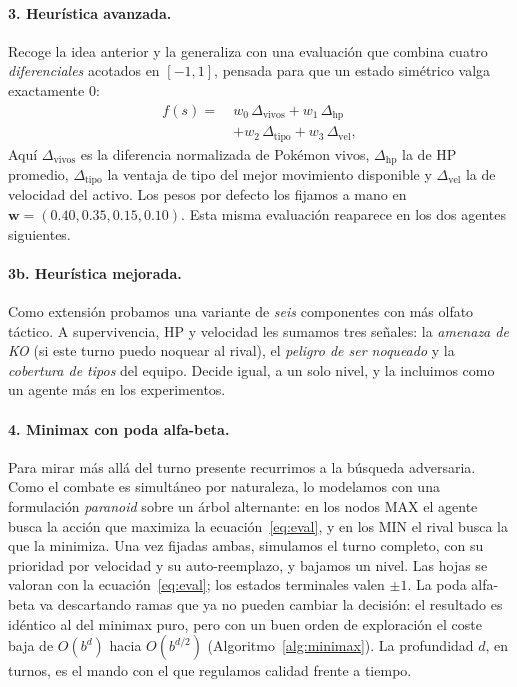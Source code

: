\documentclass[11pt]{article}
\begin{document}
\paragraph{3. Heurística avanzada.} Recoge la idea anterior y la generaliza con una
evaluación que combina cuatro \emph{diferenciales} acotados en $[-1,1]$, pensada
para que un estado simétrico valga exactamente $0$:
\begin{align}
\label{eq:eval}
f(s) =\ & w_0\,\Delta_{\text{vivos}} + w_1\,\Delta_{\text{hp}} \nonumber\\
        & + w_2\,\Delta_{\text{tipo}} + w_3\,\Delta_{\text{vel}},
\end{align}
Aquí $\Delta_{\text{vivos}}$ es la diferencia normalizada de Pokémon vivos,
$\Delta_{\text{hp}}$ la de HP promedio, $\Delta_{\text{tipo}}$ la ventaja de tipo
del mejor movimiento disponible y $\Delta_{\text{vel}}$ la de velocidad del activo.
Los pesos por defecto los fijamos a mano en $\mathbf{w}=(0.40,0.35,0.15,0.10)$.
Esta misma evaluación reaparece en los dos agentes siguientes.

\paragraph{3b. Heurística mejorada.} Como extensión probamos una variante de
\emph{seis} componentes con más olfato táctico. A supervivencia, HP y velocidad les
sumamos tres señales: la \emph{amenaza de KO} (si este turno puedo noquear al
rival), el \emph{peligro de ser noqueado} y la \emph{cobertura de tipos} del equipo.
Decide igual, a un solo nivel, y la incluimos como un agente más en los
experimentos.

\paragraph{4. Minimax con poda alfa-beta.} Para mirar más allá del turno presente
recurrimos a la búsqueda adversaria. Como el combate es simultáneo por naturaleza,
lo modelamos con una formulación \emph{paranoid} sobre un árbol alternante: en los
nodos MAX el agente busca la acción que maximiza la ecuación~\eqref{eq:eval}, y en
los MIN el rival busca la que la minimiza. Una vez fijadas ambas, simulamos el
turno completo, con su prioridad por velocidad y su auto-reemplazo, y bajamos un
nivel. Las hojas se valoran con la ecuación~\eqref{eq:eval}; los estados terminales
valen $\pm 1$. La poda alfa-beta \citep{knuth1975} va descartando ramas que ya no
pueden cambiar la decisión: el resultado es idéntico al del minimax puro, pero con
un buen orden de exploración el coste baja de $O(b^d)$ hacia $O(b^{d/2})$
(Algoritmo~\ref{alg:minimax}). La profundidad $d$, en turnos, es el mando con el
que regulamos calidad frente a tiempo.
\end{document}
